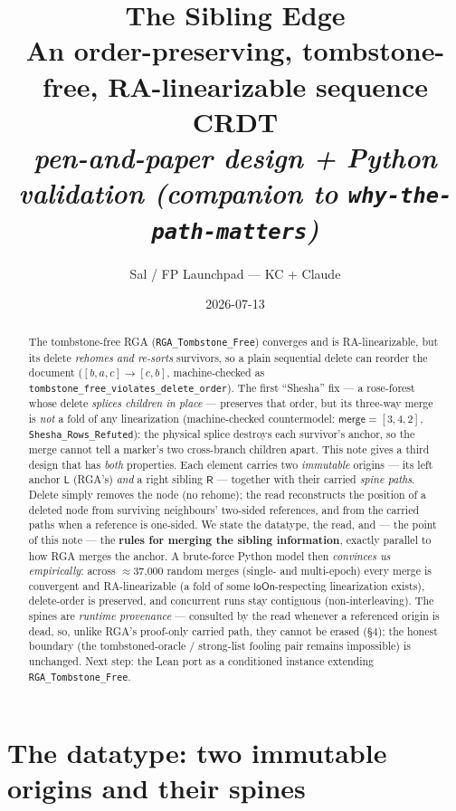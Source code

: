\documentclass[11pt]{article}
\title{\bfseries The Sibling Edge\\[2pt]
\large An order-preserving, tombstone-free, RA-linearizable sequence CRDT\\[2pt]
\normalsize\itshape pen-and-paper design + Python validation (companion to \texttt{why-the-path-matters})}
\author{Sal / FP Launchpad --- KC + Claude}
\date{2026-07-13}
\newcommand{\lo}{\mathsf{L}}
\newcommand{\ro}{\mathsf{R}}
\newcommand{\mrg}{\mathsf{merge}}
\begin{document}
\maketitle
\sloppy

\begin{abstract}
\noindent
The tombstone-free RGA (\texttt{RGA\_Tombstone\_Free}) converges and is
RA-linearizable, but its delete \emph{rehomes and re-sorts} survivors, so a
plain sequential delete can reorder the document ($[b,a,c]\to[c,b]$, machine-checked
as \texttt{tombstone\_free\_violates\_delete\_order}). The first ``Shesha'' fix --- a
rose-forest whose delete \emph{splices children in place} --- preserves that
order, but its three-way merge is \emph{not} a fold of any linearization
(machine-checked countermodel: $\mrg = [3,4,2]$, \texttt{Shesha\_Rows\_Refuted}):
the physical splice destroys each survivor's anchor, so the merge cannot tell a
marker's two cross-branch children apart. This note gives a third design that
has \emph{both} properties. Each element carries two \emph{immutable} origins ---
its left anchor $\lo$ (RGA's) \emph{and} a right sibling $\ro$ --- together with
their carried \emph{spine paths}. Delete simply removes the node (no rehome);
the read reconstructs the position of a deleted node from surviving neighbours'
two-sided references, and from the carried paths when a reference is one-sided.
We state the datatype, the read, and --- the point of this note --- the
\textbf{rules for merging the sibling information}, exactly parallel to how RGA
merges the anchor. A brute-force Python model then \emph{convinces us
empirically}: across $\approx$37{,}000 random merges (single- and multi-epoch)
every merge is convergent and RA-linearizable (a fold of some
$\mathsf{loOn}$-respecting linearization exists), delete-order is preserved, and
concurrent runs stay contiguous (non-interleaving). The spines are \emph{runtime
provenance} --- consulted by the read whenever a referenced origin is dead, so,
unlike RGA's proof-only carried path, they cannot be erased (\S4); the honest
boundary (the tombstoned-oracle / strong-list fooling pair remains impossible)
is unchanged. Next step: the Lean port as a conditioned instance extending
\texttt{RGA\_Tombstone\_Free}.
\end{abstract}

\section{The datatype: two immutable origins and their spines}
\end{document}
